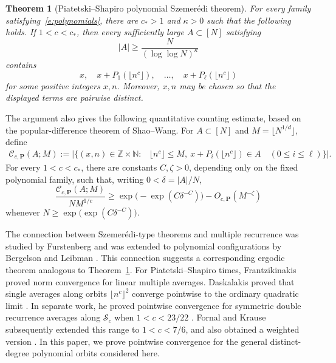 \documentclass{amsart}
\newcommand{\N}{\mathbb N}
\newcommand{\Z}{\mathbb Z}
\newcommand{\1}{\mathbf 1}
\newcommand{\calS}{\mathcal S}
\newtheorem{theorem}{Theorem}[section]
\begin{document}
\begin{theorem}[Piatetski--Shapiro polynomial Szemer\'edi theorem]
\label{t:szemeredi}
For every family satisfying~\eqref{e:polynomials}, there are $c_*>1$
and $\kappa>0$ such that the following holds.  If $1<c<c_*$, then every
sufficiently large $A\subset[N]$ satisfying
\[
 |A|\geq \frac{N}{(\log\log N)^\kappa}
\]
contains
\begin{equation}\label{e:pattern}
 x,\quad x+P_1(\lfloor n^c\rfloor),\quad\ldots,\quad
 x+P_\ell(\lfloor n^c\rfloor)
\end{equation}
for some positive integers $x,n$. Moreover, $x,n$ may be chosen so that the displayed terms are
pairwise distinct.
\end{theorem}
The argument also gives the following quantitative counting estimate,
based on the popular-difference theorem of Shao--Wang.  For
$A\subset[N]$ and $M=\lfloor N^{1/d}\rfloor$, define
\begin{align*}
 \mathcal C_{c,\mathbf P}(A;M):=
 \bigl|\bigl\{(x,n)\in\Z\times\N:{}&
 \lfloor n^c\rfloor\leq M,\ 
 x+P_i(\lfloor n^c\rfloor)\in A\quad(0\leq i\leq\ell)
 \bigr\}\bigr|.
\end{align*}
For every $1<c<c_*$, there are constants $C,\zeta>0$, depending only
on the fixed polynomial family, such that, writing
$0<\delta=|A|/N$,
\begin{equation}\label{e:quantitative-count}
 \frac{\mathcal C_{c,\mathbf P}(A;M)}{NM^{1/c}}
 \geq \exp\!\bigl(-\exp(C\delta^{-C})\bigr)
      -O_{c,\mathbf P}(M^{-\zeta})
\end{equation}
whenever $ N\geq\exp\!\bigl(\exp(C\delta^{-C})\bigr).$


The connection between Szemerédi-type theorems and multiple recurrence was studied by Furstenberg \cite{Furstenberg} and was extended to polynomial configurations by Bergelson and Leibman \cite{BergelsonLeibman}. This connection suggests a corresponding ergodic theorem analogous to Theorem~\ref{t:szemeredi}. For Piatetski--Shapiro times, Frantzikinakis
\cite[Theorem~2.1]{FrantzikinakisHardy} proved norm convergence for
linear multiple averages.  Daskalakis proved that single averages along orbits
$\lfloor n^c\rfloor^2$ converge pointwise to the ordinary quadratic
limit \cite[Theorem~1.13]{Daskalakis}.  In separate work, he proved
pointwise convergence for symmetric double recurrence averages along
$\calS_c$ when $1<c<23/22$
\cite[Theorem~1.7]{DaskalakisPointwise}.  Fornal and Krause subsequently
extended this range to
$1<c<7/6$, and also obtained a weighted version
\cite[Proposition~1.5 and Remark~4]{FornalKrause}. In this paper, we prove pointwise convergence for the general distinct-degree polynomial
orbits considered here.
\end{document}
